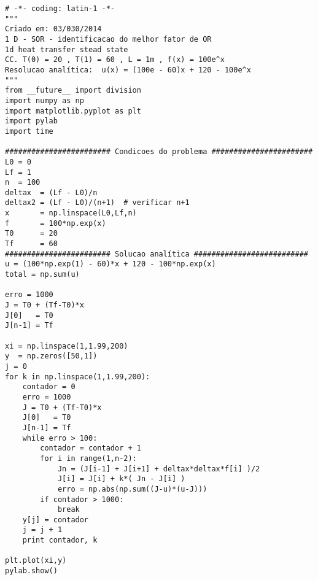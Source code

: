 \lstset{language=Python}
\begin{lstlisting}
# -*- coding: latin-1 -*-
"""
Criado em: 03/030/2014
1 D - SOR - identificacao do melhor fator de OR
1d heat transfer stead state 
CC. T(0) = 20 , T(1) = 60 , L = 1m , f(x) = 100e^x  
Resolucao analítica:  u(x) = (100e - 60)x + 120 - 100e^x 
"""
from __future__ import division
import numpy as np
import matplotlib.pyplot as plt
import pylab
import time

######################## Condicoes do problema #######################
L0 = 0
Lf = 1
n  = 100
deltax  = (Lf - L0)/n
deltax2 = (Lf - L0)/(n+1)  # verificar n+1
x       = np.linspace(L0,Lf,n)
f       = 100*np.exp(x)
T0      = 20
Tf      = 60
######################## Solucao analítica ##########################
u = (100*np.exp(1) - 60)*x + 120 - 100*np.exp(x)
total = np.sum(u)

erro = 1000
J = T0 + (Tf-T0)*x
J[0]   = T0
J[n-1] = Tf

xi = np.linspace(1,1.99,200)
y  = np.zeros([50,1])
j = 0
for k in np.linspace(1,1.99,200):
	contador = 0
	erro = 1000
	J = T0 + (Tf-T0)*x
	J[0]   = T0
	J[n-1] = Tf
	while erro > 100:
		contador = contador + 1
		for i in range(1,n-2):
			Jn = (J[i-1] + J[i+1] + deltax*deltax*f[i] )/2
			J[i] = J[i] + k*( Jn - J[i] )
			erro = np.abs(np.sum((J-u)*(u-J)))
		if contador > 1000:
			break
	y[j] = contador
	j = j + 1
	print contador, k    

plt.plot(xi,y)
pylab.show()
\end{lstlisting}